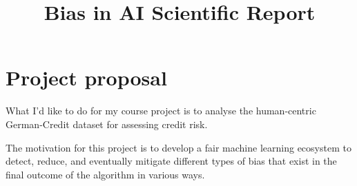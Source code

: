 \documentclass[conference]{IEEEtran}
\begin{document}
\title{Bias in AI Scientific Report}

\author{
}

\maketitle

\begin{abstract}

\end{abstract}

\begin{IEEEkeywords}

\end{IEEEkeywords}

\section{Project proposal}

What I'd like to do for my course project is to analyse the human-centric German-Credit dataset for assessing credit risk.

The motivation for this project is to develop a fair machine learning ecosystem
to detect, reduce, and eventually mitigate different types of bias that exist in the final outcome of the algorithm in various ways.
\end{document}
